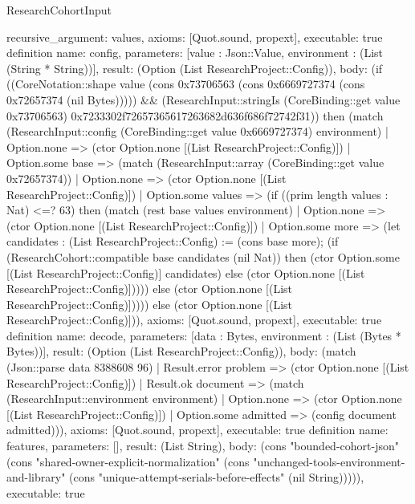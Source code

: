 \begin{lexlean}{ResearchCohortInput}
\begin{semanticmodule}
{ recursive_argument: values,
 axioms: [Quot.sound, propext],
 executable: true
}
definition{
 name: config,
 parameters: [value : Json::Value, environment : (List (String * String))],
 result: (Option (List ResearchProject::Config)),
 body: (if ((CoreNotation::shape value (cons 0x73706563 (cons 0x6669727374 (cons 0x72657374 (nil Bytes))))) && (ResearchInput::stringIs (CoreBinding::get value 0x73706563) 0x7233302f72657365617263682d636f686f72742f31)) then (match (ResearchInput::config (CoreBinding::get value 0x6669727374) environment) | Option.none => (ctor Option.none [(List ResearchProject::Config)]) | Option.some base => (match (ResearchInput::array (CoreBinding::get value 0x72657374)) | Option.none => (ctor Option.none [(List ResearchProject::Config)]) | Option.some values => (if ((prim length values : Nat) <=? 63) then (match (rest base values environment) | Option.none => (ctor Option.none [(List ResearchProject::Config)]) | Option.some more => (let candidates : (List ResearchProject::Config) := (cons base more); (if (ResearchCohort::compatible base candidates (nil Nat)) then (ctor Option.some [(List ResearchProject::Config)] candidates) else (ctor Option.none [(List ResearchProject::Config)])))) else (ctor Option.none [(List ResearchProject::Config)])))) else (ctor Option.none [(List ResearchProject::Config)])),
 axioms: [Quot.sound, propext],
 executable: true
}
definition{
 name: decode,
 parameters: [data : Bytes, environment : (List (Bytes * Bytes))],
 result: (Option (List ResearchProject::Config)),
 body: (match (Json::parse data 8388608 96) | Result.error problem => (ctor Option.none [(List ResearchProject::Config)]) | Result.ok document => (match (ResearchInput::environment environment) | Option.none => (ctor Option.none [(List ResearchProject::Config)]) | Option.some admitted => (config document admitted))),
 axioms: [Quot.sound, propext],
 executable: true
}
definition{
 name: features,
 parameters: [],
 result: (List String),
 body: (cons "bounded-cohort-json" (cons "shared-owner-explicit-normalization" (cons "unchanged-tools-environment-and-library" (cons "unique-attempt-serials-before-effects" (nil String))))),
 executable: true
}
\end{semanticmodule}
\end{lexlean}
